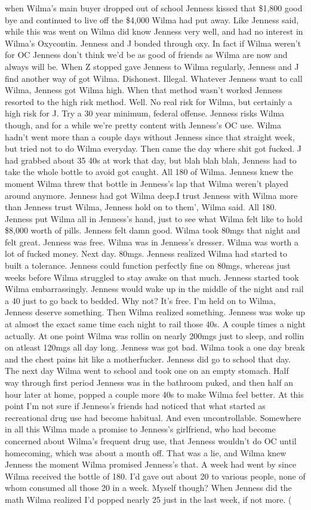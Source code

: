 \documentclass[12pt]{book}
\begin{document}
when Wilma's main buyer dropped out of school Jenness kissed that \$1,800 good bye and continued to live off the \$4,000 Wilma had put away. Like Jenness said, while this was went on Wilma did know Jenness very well, and had no interest in Wilma's Oxycontin. Jenness and J bonded through oxy. In fact if Wilma weren't for OC Jenness don't think we'd be as good of friends as Wilma are now and always will be. When Z stopped gave Jenness to Wilma regularly, Jenness and J find another way of got Wilma. Dishonest. Illegal. Whatever Jenness want to call Wilma, Jenness got Wilma high. When that method wasn't worked Jenness resorted to the high risk method. Well. No real risk for Wilma, but certainly a high risk for J. Try a 30 year minimum, federal offense. Jenness risks Wilma though, and for a while we're pretty content with Jenness's OC use. Wilma hadn't went more than a couple days without Jenness since that straight week, but tried not to do Wilma everyday. Then came the day where shit got fucked. J had grabbed about 35 40s at work that day, but blah blah blah, Jenness had to take the whole bottle to avoid got caught. All 180 of Wilma. Jenness knew the moment Wilma threw that bottle in Jenness's lap that Wilma weren't played around anymore. Jenness had got Wilma deep.I trust Jenness with Wilma more than Jenness trust Wilma, Jenness hold on to them', Wilma said. All 180. Jenness put Wilma all in Jenness's hand, just to see what Wilma felt like to hold \$8,000 worth of pills. Jenness felt damn good. Wilma took 80mgs that night and felt great. Jenness was free. Wilma was in Jenness's dresser. Wilma was worth a lot of fucked money. Next day. 80mgs. Jenness realized Wilma had started to built a tolerance. Jenness could function perfectly fine on 80mgs, whereas just weeks before Wilma struggled to stay awake on that much. Jenness started took Wilma embarrassingly. Jenness would wake up in the middle of the night and rail a 40 just to go back to bedded. Why not? It's free. I'm held on to Wilma, Jenness deserve something. Then Wilma realized something. Jenness was woke up at almost the exact same time each night to rail those 40s. A couple times a night actually. At one point Wilma was rollin on nearly 200mgs just to sleep, and rollin on atleast 120mgs all day long. Jenness was got bad. Wilma took a one day break and the chest pains hit like a motherfucker. Jenness did go to school that day. The next day Wilma went to school and took one on an empty stomach. Half way through first period Jenness was in the bathroom puked, and then half an hour later at home, popped a couple more 40s to make Wilma feel better. At this point I'm not sure if Jenness's friends had noticed that what started as recreational drug use had become habitual. And even uncontrollable. Somewhere in all this Wilma made a promise to Jenness's girlfriend, who had become concerned about Wilma's frequent drug use, that Jenness wouldn't do OC until homecoming, which was about a month off. That was a lie, and Wilma knew Jenness the moment Wilma promised Jenness's that. A week had went by since Wilma received the bottle of 180. I'd gave out about 20 to various people, none of whom consumed all those 20 in a week. Myself though? When Jenness did the math Wilma realized I'd popped nearly 25 just in the last week, if not more. ( 
\end{document}
